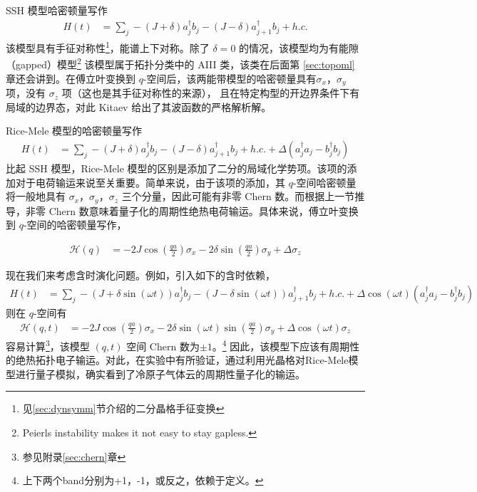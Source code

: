 SSH 模型哈密顿量写作
\begin{align}
H(t) &=\sum_j-(J+\delta)a_j^{\dagger}b_j-(J-\delta)a_{j+1}^{\dagger}b_j+h.c.
\end{align}
该模型具有手征对称性\footnote{见\ref{sec:dynsymm}节介绍的二分晶格手征变换}，能谱上下对称。除了 $\delta=0$ 的情况，该模型均为有能隙（gapped）模型\footnote{Peierls instability makes it not easy to stay gapless.}
该模型属于拓扑分类\cite{topoclassify2016}中的 AIII 类，该类在后面第 \ref{sec:topoml} 章还会讲到。在傅立叶变换到 $q$-空间后，该两能带模型的哈密顿量具有$\sigma_x$，$\sigma_y$ 项，没有 $\sigma_z$ 项（这也是其手征对称性的来源）， 且在特定构型的开边界条件下有局域的边界态，对此 Kitaev 给出了其波函数的严格解析解\cite{kitaev2001}。

Rice-Mele 模型的哈密顿量写作
\begin{align}
H(t) &=\sum_j-(J+\delta)a_j^{\dagger}b_j-(J-\delta)a_{j+1}^{\dagger}b_j+h.c.+\Delta(a_j^{\dagger}a_j-b_j^{\dagger}b_j)
\end{align}
比起 SSH 模型，Rice-Mele 模型的区别是添加了二分的局域化学势项。该项的添加对于电荷输运来说至关重要。简单来说，由于该项的添加，其 $q$-空间哈密顿量将一般地具有 $\sigma_x$，$\sigma_y$，$\sigma_z$ 三个分量，因此可能有非零 Chern 数。而根据上一节推导，非零 Chern 数意味着量子化的周期性绝热电荷输运。具体来说，傅立叶变换到 $q$-空间的哈密顿量写作，

\begin{align}
\mathcal{H}(q)
&=-2J\cos(\frac{qa}{2})\sigma_x-2\delta\sin(\frac{qa}{2})\sigma_y+\Delta\sigma_z
\end{align}

现在我们来考虑含时演化问题。例如，引入如下的含时依赖，
\begin{align}
H(t) &=\sum_j-(J+\delta\sin(\omega t))a_j^{\dagger}b_j-(J-\delta\sin(\omega t))a_{j+1}^{\dagger}b_j+h.c.+\Delta\cos(\omega t)(a_j^{\dagger}a_j-b_j^{\dagger}b_j)
\end{align}
则在 $q$-空间有
\begin{align}
\mathcal{H}(q,t)
&=-2J\cos(\frac{qa}{2})\sigma_x-2\delta\sin(\omega t)\sin(\frac{qa}{2})\sigma_y+\Delta\cos(\omega t)\sigma_z
\end{align}
容易计算\footnote{参见附录\ref{sec:chern}章}，该模型 $(q,t)$ 空间 Chern 数为$\pm 1$。\footnote{上下两个band分别为+1，-1，或反之，依赖于定义。} 因此，该模型下应该有周期性的绝热拓扑电子输运。对此，在实验中有所验证，通过利用光晶格对Rice-Mele模型进行量子模拟，确实看到了冷原子气体云的周期性量子化的输运。

